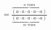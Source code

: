 \documentclass[preview]{standalone}
\begin{document}
\begin{align*}
=\frac{\overbrace{(a \cdot a \cdot a \cdot a \cdots a)}^{n \text{ vezes}}}{ \underbrace{(a \cdot a \cdot a \cdot a \cdots a)}_{m \text{ vezes}}}
\end{align*}
\end{document}
